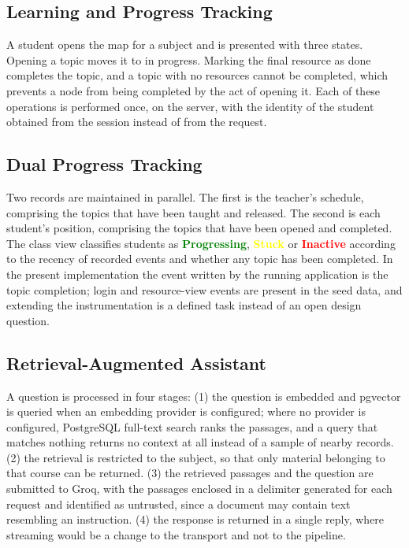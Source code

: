 \subsection{Learning and Progress Tracking}

A student opens the map for a subject and is presented with three states. Opening a topic moves it to in progress. Marking the final resource as done completes the topic, and a topic with no resources cannot be completed, which prevents a node from being completed by the act of opening it. Each of these operations is performed once, on the server, with the identity of the student obtained from the session instead of from the request.

\subsection{Dual Progress Tracking}

Two records are maintained in parallel. The first is the teacher's schedule, comprising the topics that have been taught and released. The second is each student's position, comprising the topics that have been opened and completed. The class view classifies students as \textcolor{green}{\textbf{Progressing}}, \textcolor{yellow}{\textbf{Stuck}} or \textcolor{red}{\textbf{Inactive}} according to the recency of recorded events and whether any topic has been completed. In the present implementation the event written by the running application is the topic completion; login and resource-view events are present in the seed data, and extending the instrumentation is a defined task instead of an open design question.

\subsection{Retrieval-Augmented Assistant}

A question is processed in four stages: (1) the question is embedded and pgvector is queried when an embedding provider is configured; where no provider is configured, PostgreSQL full-text search ranks the passages, and a query that matches nothing returns no context at all instead of a sample of nearby records. (2) the retrieval is restricted to the subject, so that only material belonging to that course can be returned. (3) the retrieved passages and the question are submitted to Groq, with the passages enclosed in a delimiter generated for each request and identified as untrusted, since a document may contain text resembling an instruction. (4) the response is returned in a single reply, where streaming would be a change to the transport and not to the pipeline.


